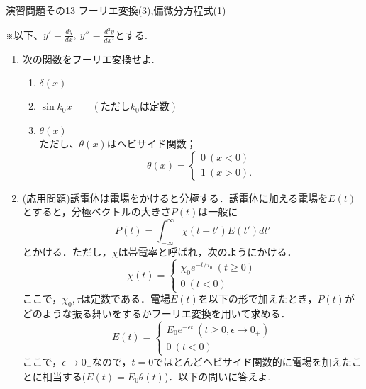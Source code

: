 \documentclass[11pt]{jsarticle}
\begin{document}
\begin{center}
{\Large
演習問題その13  フーリエ変換(3),偏微分方程式(1)}
\end{center}
※以下、$y'=\frac{dy}{dx},~y''=\frac{d^2 y}{dx^2}$とする.
\begin{enumerate}

\item 次の関数をフーリエ変換せよ.
\begin{enumerate}
\item[(1)] $\delta (x)$
\item[(2)] $\sin{k_0}x\qquad (ただしk_0は定数)$
\item[(3)] $\theta (x)$\\
ただし、$\theta (x)$はヘビサイド関数；\begin{equation*}
 \theta (x) =
   \begin{cases}
    0 \ (x<0)\\
    1 \ (x>0).
  \end{cases}
\end{equation*}
\end{enumerate}

\newpage
\item (応用問題)誘電体は電場をかけると分極する．誘電体に加える電場を$E(t)$とすると，分極ベクトルの大きさ$P(t)$は一般に
\begin{equation*}
P(t)=\int_{-\infty}^{\infty} \chi (t-t') E(t')dt'
\end{equation*}
とかける．ただし，$\chi$は帯電率と呼ばれ，次のようにかける．
\begin{equation*}
\chi(t)=
  \begin{cases}
    \chi_{0}e^{-t/\tau_{0}} \ (t \geq 0)\\
    0 \ (t<0)
  \end{cases}
\end{equation*}
ここで，$\chi_{0}, \tau$は定数である．電場$E(t)$を以下の形で加えたとき，$P(t)$がどのような振る舞いをするかフーリエ変換を用いて求める．
\begin{equation*}
E(t)=
  \begin{cases}
    E_{0}e^{-\epsilon t} \ (t \geq 0, \epsilon \rightarrow 0_{+})\\
    0 \ (t<0)
  \end{cases}
\end{equation*}
ここで，$\epsilon \rightarrow 0_{+}$なので，$t=0$でほとんどヘビサイド関数的に電場を加えたことに相当する($E(t)=E_{0} \theta (t)$)．以下の問いに答えよ.\\


\end{enumerate}
\end{document}
